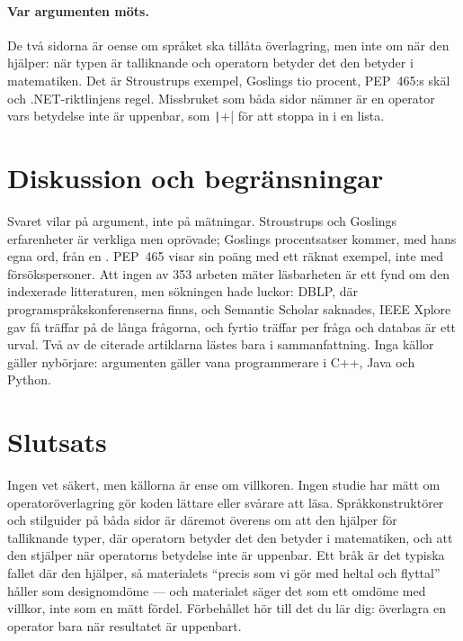 \paragraph{Var argumenten möts.}  De två sidorna är oense om
språket ska tillåta överlagring, men inte om när den hjälper: när typen
är talliknande och operatorn betyder det den betyder i matematiken.
Det är Stroustrups exempel, Goslings tio procent, PEP~465:s skäl och
.NET-riktlinjens regel.  Missbruket som båda sidor nämner är en
operator vars betydelse inte är uppenbar, som \texttt|+| för
att stoppa in i en lista.

\section{Diskussion och begränsningar}
\label{sec:ovl-diskussion}

Svaret vilar på argument, inte på mätningar.  Stroustrups och Goslings
erfarenheter är verkliga men oprövade; Goslings procentsatser kommer,
med hans egna ord, från en .  PEP~465 visar sin poäng med ett räknat exempel,
inte med försökspersoner.  Att ingen av 353 arbeten mäter
läsbarheten är ett fynd om den indexerade litteraturen, men sökningen
hade luckor: DBLP, där programspråkskonferenserna finns, och Semantic
Scholar saknades, IEEE Xplore gav få träffar på de långa frågorna, och
fyrtio träffar per fråga och databas är ett urval.  Två av de citerade
artiklarna lästes bara i sammanfattning.  Inga källor gäller nybörjare:
argumenten gäller vana programmerare i C++, Java och Python.

\section{Slutsats}
\label{sec:ovl-slutsats}

Ingen vet säkert, men källorna är ense om villkoren.  Ingen studie har
mätt om operatoröverlagring gör koden lättare eller svårare att läsa.
Språkkonstruktörer och stilguider på båda sidor är däremot överens om
att den hjälper för talliknande typer, där operatorn betyder det den
betyder i matematiken\autocite{Stroustrup1993History,Smith2014PEP465,Sutter2000CFamily,Cwalina2008Operators},
och att den stjälper när operatorns betydelse inte är uppenbar.  Ett
bråk är det typiska fallet där den hjälper, så materialets
\enquote{precis som vi gör med heltal och flyttal} håller som
designomdöme --- och materialet säger det som ett omdöme med villkor,
inte som en mätt fördel.  Förbehållet hör till det du lär dig:
överlagra en operator bara när resultatet är uppenbart.

